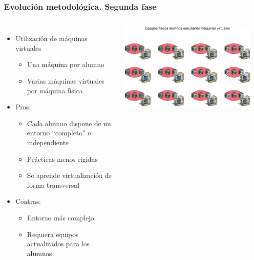 \documentclass{beamer}
\begin{document}
\begin{frame}
  \frametitle{Evolución metodológica. Segunda fase}
  \begin{columns}
    \begin{itemize}
    \item Utilización de máquinas virtuales
      \begin{itemize}
      \item Una máquina por alumno
      \item Varias máquinas virtuales por máquina física
      \end{itemize}
      \item Pros:
      \begin{itemize}
      \item Cada alumno dispone de un entorno ``completo'' e independiente
      \item Prácticas menos rígidas
      \item Se aprende virtualización de forma transversal
      \end{itemize}
      \item Contras:
      \begin{itemize}
      \item Entorno más complejo
      \item Requiera equipos actualizados para los alumnos
      \end{itemize}
    \end{itemize}
    \includegraphics[width=\columnwidth]{../img/epoca2.png}
  \end{columns}
\end{frame}
\end{document}
